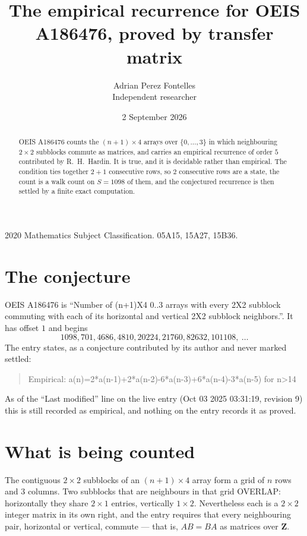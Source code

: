 \documentclass[11pt,a4paper]{article}
\title{The empirical recurrence for OEIS A186476, proved by transfer matrix}
\author{Adrian Perez Fontelles\\ \small Independent researcher}
\date{2 September 2026}
\theoremstyle{plain}
\theoremstyle{definition}
\begin{document}
\maketitle

\begin{abstract}
OEIS A186476 counts the $(n+1)\times4$ arrays over $\{0,\dots,3\}$ in which
neighbouring $2\times2$ subblocks commute as matrices, and carries an empirical recurrence
of order $5$ contributed by R.~H.~Hardin. It is true, and it is decidable rather than
empirical. The condition ties together $2+1$ consecutive rows, so $2$ consecutive rows are
a state, the count is a walk count on $S=1098$ of them, and the conjectured recurrence is then
settled by a finite exact computation.
\end{abstract}

\noindent\small 2020 Mathematics Subject Classification. 05A15, 15A27, 15B36.\normalsize

\section{The conjecture}

OEIS A186476 is ``Number of (n+1)X4 0..3 arrays with every 2X2 subblock commuting with each of its horizontal and vertical 2X2 subblock neighbors.''. It has offset $1$ and begins
\[
1098, 701, 4686, 4810, 20224, 21760, 82632, 101108,\ \dots
\]
The entry states, as a conjecture contributed by its author and never marked settled:
\begin{quote}
Empirical: a(n)=2*a(n-1)+2*a(n-2)-6*a(n-3)+6*a(n-4)-3*a(n-5) for n>14
\end{quote}
As of the ``Last modified'' line on the live entry (Oct 03 2025 03:31:19, revision 9) this is still
recorded as empirical, and nothing on the entry records it as proved.

\section{What is being counted}

The contiguous $2\times2$ subblocks of an $(n+1)\times4$ array form a grid of $n$
rows and $3$ columns. Two subblocks that are neighbours in that
grid OVERLAP: horizontally they share $2\times1$ entries, vertically
$1\times2$. Nevertheless each is a $2\times2$ integer matrix in its own right, and
the entry requires that every neighbouring pair, horizontal or vertical, commute --- that is,
$AB=BA$ as matrices over $\mathbf{Z}$.
\end{document}

